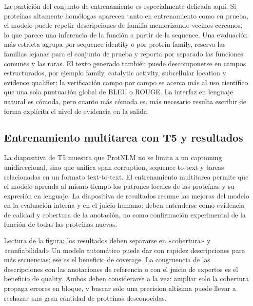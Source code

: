 La partición del conjunto de entrenamiento es especialmente delicada aquí. Si proteínas altamente homólogas aparecen tanto en entrenamiento como en prueba, el modelo puede repetir descripciones de familia memorizando vecinos cercanos, lo que parece una inferencia de la función a partir de la sequence. Una evaluación más estricta agrupa por sequence identity o por protein family, reserva las familias lejanas para el conjunto de prueba y reporta por separado las funciones comunes y las raras. El texto generado también puede descomponerse en campos estructurados, por ejemplo family, catalytic activity, subcellular location y evidence qualifier; la verificación campo por campo se acerca más al uso científico que una sola puntuación global de BLEU o ROUGE. La interfaz en lenguaje natural es cómoda, pero cuanto más cómoda es, más necesario resulta escribir de forma explícita el nivel de evidencia en la salida.

\subsection{Entrenamiento multitarea con T5 y resultados}

La diapositiva de T5 muestra que ProtNLM no se limita a un captioning unidireccional, sino que unifica span corruption, sequence-to-text y tareas relacionadas en un formato text-to-text. El entrenamiento multitarea permite que el modelo aprenda al mismo tiempo los patrones locales de las proteínas y su expresión en lenguaje. La diapositiva de resultados resume las mejoras del modelo en la evaluación interna y en el juicio humano; deben entenderse como evidencia de calidad y cobertura de la anotación, no como confirmación experimental de la función de todas las proteínas nuevas.



\begin{knowledgebox}{Lectura de la figura: los resultados deben separarse en «cobertura» y «confiabilidad»}
Un modelo automático puede dar con rapidez descripciones para más secuencias; ese es el beneficio de coverage. La congruencia de las descripciones con las anotaciones de referencia o con el juicio de expertos es el beneficio de quality. Ambos deben considerarse a la vez: ampliar solo la cobertura propaga errores en bloque, y buscar solo una precision altísima puede llevar a rechazar una gran cantidad de proteínas desconocidas.
\end{knowledgebox}

